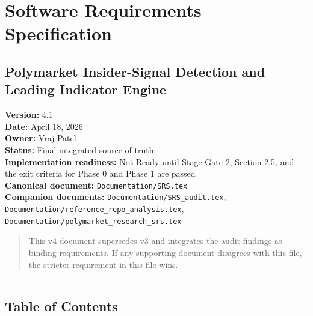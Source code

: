 \documentclass[
]{article}
\author{}
\date{}
\begin{document}
\section{Software Requirements
Specification}\label{software-requirements-specification}

\subsection{Polymarket Insider-Signal Detection and Leading Indicator
Engine}\label{polymarket-insider-signal-detection-and-leading-indicator-engine}

\textbf{Version:} 4.1\\
\textbf{Date:} April 18, 2026\\
\textbf{Owner:} Vraj Patel\\
\textbf{Status:} Final integrated source of truth\\
\textbf{Implementation readiness:} Not Ready until Stage Gate 2,
Section 2.5, and the exit criteria for Phase 0 and Phase 1 are
passed\\
\textbf{Canonical document:} \texttt{Documentation/SRS.tex}\\
\textbf{Companion documents:} \texttt{Documentation/SRS\_audit.tex},
\texttt{Documentation/reference\_repo\_analysis.tex},
\texttt{Documentation/polymarket\_research\_srs.tex}

\begin{quote}
This v4 document supersedes v3 and integrates the audit findings as
binding requirements. If any supporting document disagrees with this
file, the stricter requirement in this file wins.
\end{quote}

\begin{center}\rule{0.5\linewidth}{0.5pt}\end{center}

\subsection{Table of Contents}\label{table-of-contents}
\end{document}
